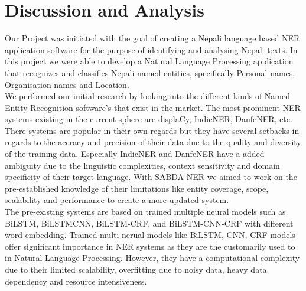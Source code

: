  \section{Discussion and Analysis}





Our Project was initiated with the goal of creating a Nepali language based NER application software for the purpose of identifying and analysing Nepali texts. In this project we were able to develop a Natural Language Processing application that recognizes and classifies Nepali named entities, specifically Personal names, Organisation names and Location. \\

We performed our initial research by looking into the different kinds of Named Entity Recognition software's that exist in the market. The most prominent NER systems existing in the current sphere are displaCy, IndicNER, DanfeNER, etc. There systems are popular in their own regards but they have several setbacks in regards to the accracy and precision of their data due to the quality and diversity of the training data. Especially IndicNER and DanfeNER have a added ambiguity due to the linguistic complexities, context sensitivity and domain specificity of their target language. With SABDA-NER we aimed to work on the pre-established knowledge of their limitations like entity coverage, scope, scalability and performance to create a more updated system.\\
 
The pre-existing systems are based on trained multiple neural models such as BiLSTM,
BiLSTMCNN, BiLSTM-CRF, and BiLSTM-CNN-CRF with different word embedding. Trained multi-nerual models like BiLSTM, CNN, CRF models offer significant importance in NER systems as they are the customarily used to in Natural Language Processing. However, they have a computational complexity due to their limited scalability, overfitting due to noisy data, heavy data dependency and resource intensiveness. \\\

